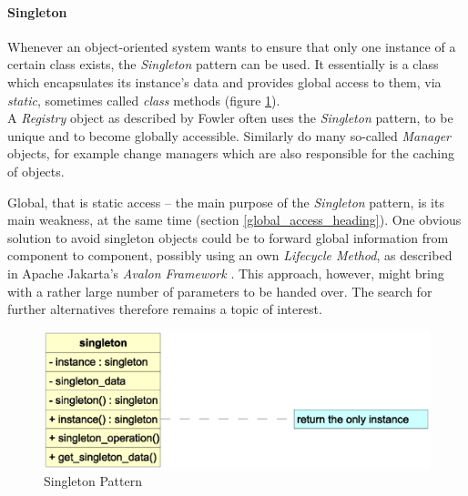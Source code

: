 %
%
%
%
%
%
%

\paragraph{Singleton}
\label{singleton_heading}

Whenever an object-oriented system wants to ensure that only one instance of a
certain class exists, the \emph{Singleton} pattern \cite{gamma1995} can be used.
It essentially is a class which encapsulates its instance's data and provides
global access to them, via \emph{static}, sometimes called \emph{class} methods
(figure \ref{singleton_figure}).\\

A \emph{Registry} object as described by Fowler \cite{fowler2002} often uses the
\emph{Singleton} pattern, to be unique and to become globally accessible.
Similarly do many so-called \emph{Manager} objects, for example change managers
which are also responsible for the caching of objects.

Global, that is static access -- the main purpose of the \emph{Singleton} pattern,
is its main weakness, at the same time (section \ref{global_access_heading}). One
obvious solution to avoid singleton objects could be to forward global information
from component to component, possibly using an own \emph{Lifecycle Method}, as
described in Apache Jakarta's \emph{Avalon Framework} \cite{avalon}. This approach,
however, might bring with a rather large number of parameters to be handed over.
The search for further alternatives therefore remains a topic of interest.

\begin{figure}[ht]
    \begin{center}
        \includegraphics[scale=0.3]{vector/singleton.eps}
        \caption{Singleton Pattern}
        \label{singleton_figure}
    \end{center}
\end{figure}
